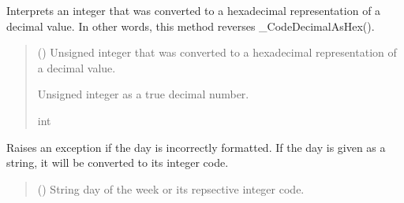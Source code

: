 \documentclass[letterpaper,10pt,english]{sphinxmanual}
\begin{document}
\begin{fulllineitems}
\begin{fulllineitems}
\label{\detokenize{PodDevice_8229:PodDevice_8229.POD_8229._DecodeDecimalAsHex}}
\pysigstartsignatures
{}
\pysigstopsignatures
\sphinxAtStartPar
Interprets an integer that was converted to a hexadecimal representation of a         decimal value. In other words, this method reverses \_CodeDecimalAsHex().
\begin{quote}\begin{description}
\sphinxAtStartPar
{} () \textendash{} Unsigned integer that was converted to a hexadecimal representation of a                 decimal value.

\sphinxAtStartPar
Unsigned integer as a true decimal number.

\sphinxAtStartPar
int

\end{description}\end{quote}

\end{fulllineitems}


\begin{fulllineitems}
\label{\detokenize{PodDevice_8229:PodDevice_8229.POD_8229._Validate_Day}}
\pysigstartsignatures
{}
\pysigstopsignatures
\sphinxAtStartPar
Raises an exception if the day is incorrectly formatted. If the day is given as         a string, it will be converted to its integer code.
\begin{quote}\begin{description}
\sphinxAtStartPar
{} (\sphinxstyleliteralemphasis{\sphinxupquote{ | }}) \textendash{} String day of the week or its repsective integer code.


\end{description}
\end{quote}
\end{fulllineitems}
\end{fulllineitems}
\end{document}
